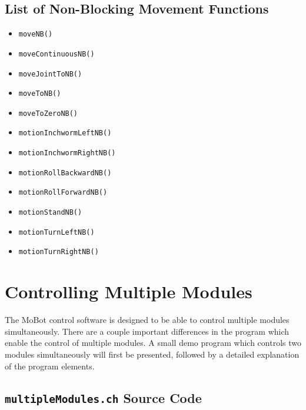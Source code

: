 \documentclass{article}
\begin{document}
\subsection{List of Non-Blocking Movement Functions}
\begin{itemize}
\item \texttt{moveNB()}
\item \texttt{moveContinuousNB()}
\item \texttt{moveJointToNB()}
\item \texttt{moveToNB()}
\item \texttt{moveToZeroNB()}
\item \texttt{motionInchwormLeftNB()}
\item \texttt{motionInchwormRightNB()}
\item \texttt{motionRollBackwardNB()}
\item \texttt{motionRollForwardNB()}
\item \texttt{motionStandNB()}
\item \texttt{motionTurnLeftNB()}
\item \texttt{motionTurnRightNB()}
\end{itemize}

\section{Controlling Multiple Modules}
The MoBot control software is designed to be able to control multiple modules
simultaneously. There are a couple important differences in the program 
which enable the control of multiple modules. A small demo program which
controls two modules simultaneously will first be presented, followed by
a detailed explanation of the program elements.

\subsection{\texttt{multipleModules.ch} Source Code}

\end{document}

